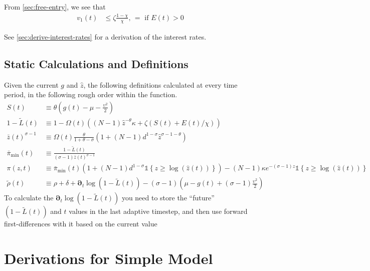 \documentclass[11pt]{article}
\newcommand{\D}[1][]{\ensuremath{\boldsymbol{\partial}_{#1}}}
\newcommand{\indicator}[1]{\ensuremath{\mathds{1}\left\{{#1}\right\}}}
\begin{document}
From \cref{sec:free-entry}, we see that
\begin{align}
	v_1(t) &\leq \zeta \frac{1-\chi}{\chi},\, = \text{ if } E(t) > 0
\end{align}

See \cref{sec:derive-interest-rates} for a derivation of the interest rates.

\subsection{Static Calculations and Definitions}
Given the current $g$ and $\hat{z}$, the following definitions calculated at every time period, in the following rough order within the function.
\begin{align}
	S(t) &\equiv \theta \left( g(t) - \mu - \frac{\upsilon^2}{2}\right)\\
	1 - \tilde{L}(t) &\equiv 1 - \Omega(t)\left((N -1)\hat{z}^{-\theta}\kappa + \zeta \left(S(t) + E(t)/\chi \right)\right)\\
	\bar{z}(t)^{\sigma - 1}&\equiv \Omega(t)
\frac{\theta}{1+\theta - \sigma}\left(1 + (N-1)d^{1-\sigma}\hat{z}^{\sigma - 1 -\theta} \right)\label{eq:z-bar-sub-power}\\
	\bar{\pi}_{\min}(t) &\equiv \frac{1-\tilde{L}(t)}{(\sigma-1)\bar{z}(t)^{\sigma-1}}\label{eq:pi-min-def}\\
	\pi(z,t) &\equiv \bar{\pi}_{\min}(t)\left(1 + (N-1)d^{1-\sigma}\indicator{z \geq \log(\hat{z}(t))}\right) - (N-1)\kappa e^{-(\sigma - 1)z}\indicator{z \geq \log(\hat{z}(t))}\\
	\tilde{\rho}(t) &\equiv \rho+ \delta + \D[t]\log\left(1 - \tilde{L}(t)\right) - (\sigma - 1)\left(\mu - g(t) + (\sigma - 1)\frac{\upsilon^2}{2} \right)\label{eq:rhot}
\end{align}
To calculate the $\D[t]\log\left(1 - \tilde{L}(t)\right)$ you need to store the ``future'' $\left(1 - \tilde{L}(t)\right)$ and $t$ values in the last adaptive timestep, and then use forward first-differences with it based on the current value

\appendix
\makeatletter
\def\@seccntformat#1{Appendix\ \csname the#1\endcsname\quad}
\makeatother
\makeatletter
\def\@seccntformat#1{\csname Pref@#1\endcsname \csname the#1\endcsname\quad}
\def\Pref@section{Appendix~}
\makeatother
{}
\let\normalsize\small
\small
\section{Derivations for Simple Model}\label{sec:simple-derivation}
\end{document}

